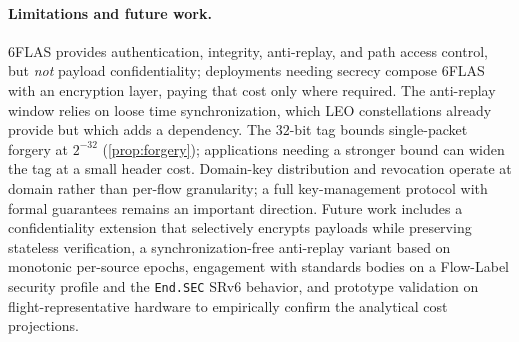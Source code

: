\paragraph{Limitations and future work.}
6FLAS provides authentication, integrity, anti-replay, and path access control,
but \emph{not} payload confidentiality; deployments needing secrecy compose
6FLAS with an encryption layer, paying that cost only where required. The
anti-replay window relies on loose time synchronization, which LEO constellations
already provide but which adds a dependency. The $32$-bit tag bounds single-packet
forgery at $2^{-32}$ (\cref{prop:forgery}); applications needing a stronger bound
can widen the tag at a small header cost. Domain-key distribution and
revocation operate at domain rather than per-flow granularity;
a full key-management protocol with formal guarantees
remains an important direction. Future work includes a confidentiality extension
that selectively encrypts payloads while preserving stateless verification, a
synchronization-free anti-replay variant based on monotonic per-source epochs,
engagement with standards bodies on a Flow-Label security profile and the
\texttt{End.SEC} SRv6 behavior, and prototype validation on flight-representative
hardware to empirically confirm the analytical cost projections.
